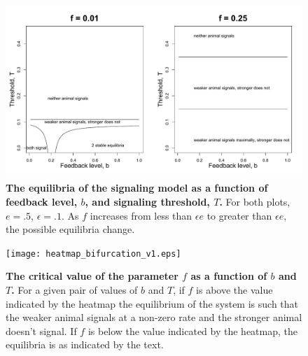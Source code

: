 \documentclass{article}
\begin{document}
\begin{figure}
\begin{center}
\includegraphics[width=1\textwidth]{bifurc_diagram.pdf}
\end{center}
\caption{{\bf The equilibria of the signaling model as a function of feedback level, $b$, and signaling threshold, $T$.} For both plots, $e=.5$, $\epsilon=.1$. As $f$ increases from less than $\epsilon e$ to greater than $\epsilon e$, the possible equilibria change.  \label{bifurcation}}
\end{figure}

\begin{figure}
\begin{center}
\texttt{[image: heatmap\_bifurcation\_v1.eps]}
\end{center}
\caption{{\bf The critical value of the parameter $f$ as a function of $b$ and $T$.}  For a given pair of values of $b$ and $T$, if $f$ is above the value indicated by the heatmap the equilibrium of the system is such that the weaker animal signals at a non-zero rate and the stronger animal doesn't signal.  If $f$ is below the value indicated by the heatmap, the equilibria is as indicated by the text. \label{f_heatmap}}
\end{figure}
\end{document}
